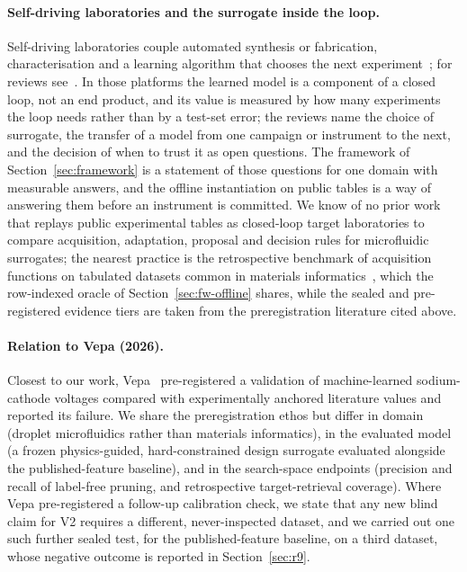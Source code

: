 \documentclass[11pt,a4paper]{article}
\begin{document}
\paragraph{Self-driving laboratories and the surrogate inside the loop.} Self-driving
laboratories couple automated synthesis or fabrication, characterisation and a
learning algorithm that chooses the next experiment~\cite{macleod2020}; for reviews
see~\cite{abolhasani2023,tom2024sdl}.
In those platforms the learned model is a component of a closed loop, not an
end product, and its value is measured by how many experiments the loop needs
rather than by a test-set error; the reviews name the choice of surrogate,
the transfer of a model from one campaign or instrument to the next, and the
decision of when to trust it as open questions. The framework of
Section~\ref{sec:framework} is a statement of those questions for one domain
with measurable answers, and the offline instantiation on public tables is a
way of answering them before an instrument is committed. We know of no prior
work that replays public experimental tables as closed-loop target
laboratories to compare acquisition, adaptation, proposal and decision rules
for microfluidic surrogates; the nearest practice is the retrospective
benchmark of acquisition functions on tabulated datasets common in materials
informatics~\cite{liang2021bo}, which the row-indexed oracle of Section~\ref{sec:fw-offline}
shares, while the sealed and pre-registered evidence tiers are taken from the
preregistration literature cited above.

\paragraph{Relation to Vepa (2026).} Closest to our work, Vepa~\cite{vepa2026}
pre-registered a validation of machine-learned sodium-cathode voltages compared with
experimentally anchored literature values and reported its failure. We share
the preregistration ethos but differ in domain (droplet microfluidics rather
than materials informatics), in the evaluated model (a frozen physics-guided,
hard-constrained design surrogate evaluated alongside the published-feature
baseline), and in the search-space endpoints (precision and recall of label-free
pruning, and retrospective target-retrieval coverage). Where Vepa pre-registered a follow-up
calibration check, we state that any new blind claim for V2 requires a
different, never-inspected dataset, and we carried out one such further
sealed test, for the published-feature baseline, on a third dataset, whose
negative outcome is reported in Section~\ref{sec:r9}.
\end{document}
